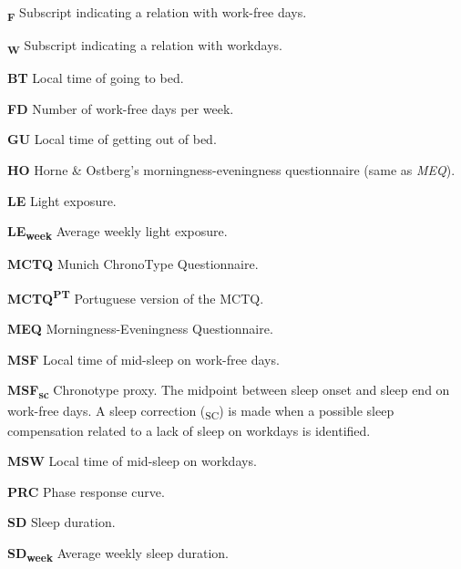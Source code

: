 
\renewcommand{\listtablename}{LIST OF TABLES}
\pdfbookmark[0]{\listtablename}{lot}
\listoftables*
\cleardoublepage


\begin{siglas}
  \item[\textbf{\textsubscript{F}}] Subscript indicating a relation with
    work-free days.
  \item[\textbf{\textsubscript{W}}] Subscript indicating a relation with
    workdays.
  \item[\textbf{BT}] Local time of going to bed.
  \item[\textbf{FD}] Number of work-free days per week.
  \item[\textbf{GU}] Local time of getting out of bed.
  \item[\textbf{HO}] Horne \& Ostberg's morningness-eveningness questionnaire
    (same as \emph{MEQ}).
  \item[\textbf{LE}] Light exposure.
  \item[\textbf{LE\textsubscript{week}}] Average weekly light exposure.
  \item[\textbf{MCTQ}] Munich ChronoType Questionnaire.
  \item[\textbf{MCTQ\textsuperscript{PT}}] Portuguese version of the MCTQ.
  \item[\textbf{MEQ}] Morningness-Eveningness Questionnaire.
  \item[\textbf{MSF}] Local time of mid-sleep on work-free days.
  \item[\textbf{MSF\textsubscript{sc}}] Chronotype proxy. The midpoint between
    sleep onset and sleep end on work-free days. A sleep correction
    (\textsubscript{SC}) is made when a possible sleep compensation
    related to a lack of sleep on workdays is identified.
  \item[\textbf{MSW}] Local time of mid-sleep on workdays.
  \item[\textbf{PRC}] Phase response curve.
  \item[\textbf{SD}] Sleep duration.
  \item[\textbf{SD\textsubscript{week}}] Average weekly sleep duration.

\end{siglas}
